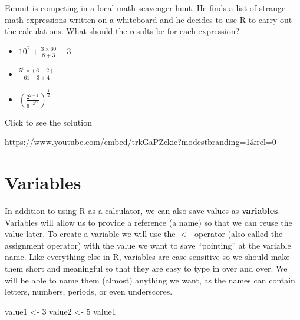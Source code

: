 \documentclass[
  letterpaper,
  DIV=11,
  numbers=noendperiod]{scrreprt}
\newenvironment{Shaded}{\begin{snugshade}}{\end{snugshade}}
\newcommand{\DecValTok}[1]{\textcolor[rgb]{0.68,0.00,0.00}{#1}}
\newcommand{\NormalTok}[1]{\textcolor[rgb]{0.00,0.23,0.31}{#1}}
\newcommand{\OtherTok}[1]{\textcolor[rgb]{0.00,0.23,0.31}{#1}}
\providecommand{\tightlist}{%
  \setlength{\itemsep}{0pt}\setlength{\parskip}{0pt}}
\begin{document}
\begin{tcolorbox}[enhanced jigsaw, colbacktitle=quarto-callout-tip-color!10!white, breakable, bottomrule=.15mm, colframe=quarto-callout-tip-color-frame, left=2mm, opacitybacktitle=0.6, title=\textcolor{quarto-callout-tip-color}{\faLightbulb}\hspace{0.5em}{Try it Out}, leftrule=.75mm, opacityback=0, rightrule=.15mm, titlerule=0mm, bottomtitle=1mm, colback=white, toprule=.15mm, arc=.35mm, toptitle=1mm, coltitle=black]

Emmit is competing in a local math scavenger hunt. He finds a list of
strange math expressions written on a whiteboard and he decides to use R
to carry out the calculations. What should the results be for each
expression?

\begin{itemize}
\tightlist
\item
  \(\displaystyle 10^2 + \frac{3\times 60}{8 + 3} - 3\)
\item
  \(\displaystyle \frac{5^3\times(6-2)}{61-3+4}\)
\item
  \(\displaystyle \left(\frac{2^{2+1}}{6^{-2^{2.5}}}\right)^\frac{1}{2}\)
\end{itemize}

Click to see the solution

\url{https://www.youtube.com/embed/trkGaPZckic?modestbranding=1&rel=0}

\end{tcolorbox}

\section{Variables}\label{variables}

In addition to using R as a calculator, we can also save values as
\textbf{variables}. Variables will allow us to provide a reference (a
name) so that we can reuse the value later. To create a variable we will
use the \(<\)- operator (also called the assignment operator) with the
value we want to save ``pointing'' at the variable name. Like everything
else in R, variables are case-sensitive so we should make them short and
meaningful so that they are easy to type in over and over. We will be
able to name them (almost) anything we want, as the names can contain
letters, numbers, periods, or even underscores.

\begin{Shaded}
\begin{Highlighting}[]
\NormalTok{value1 }\OtherTok{\textless{}{-}} \DecValTok{3}
\NormalTok{value2 }\OtherTok{\textless{}{-}} \DecValTok{5}
\NormalTok{value1}
\end{Highlighting}
\end{Shaded}
\end{document}
